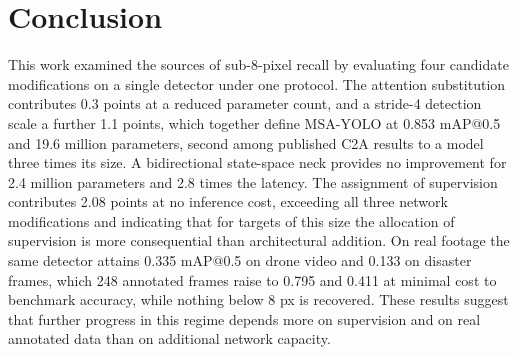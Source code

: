 \documentclass[conference,a4paper]{IEEEtran}
\begin{document}
\section{Conclusion}
This work examined the sources of sub-8-pixel recall by evaluating four
candidate modifications on a single detector under one protocol. The attention
substitution contributes 0.3 points at a reduced parameter count, and a stride-4
detection scale a further 1.1 points, which together define MSA-YOLO at 0.853
mAP@0.5 and 19.6 million parameters, second among published C2A results to a
model three times its size. A bidirectional state-space neck provides no
improvement for 2.4 million parameters and 2.8 times the latency. The assignment
of supervision contributes 2.08 points at no inference cost, exceeding all three
network modifications and indicating that for targets of this size the
allocation of supervision is more consequential than architectural addition. On
real footage the same detector attains 0.335 mAP@0.5 on drone video and 0.133 on
disaster frames, which 248 annotated frames raise to 0.795 and 0.411 at minimal
cost to benchmark accuracy, while nothing below 8 px is recovered. These results
suggest that further progress in this regime depends more on supervision and on
real annotated data than on additional network capacity.



\end{document}

